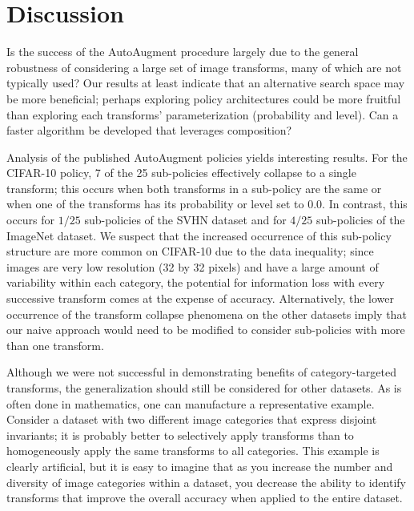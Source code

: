 \documentclass[10pt,twocolumn,letterpaper]{article}
\begin{document}
\section{Discussion}
  Is the success of the AutoAugment procedure largely due to the general robustness of considering a large set of image transforms, many of which are not typically used? Our results at least indicate that an alternative search space may be more beneficial; perhaps exploring policy architectures could be more fruitful than exploring each transforms' parameterization (probability and level). Can a faster algorithm be developed that leverages composition?

  Analysis of the published AutoAugment policies yields interesting results. For the CIFAR-10 policy, 7 of the 25 sub-policies effectively collapse to a single transform; this occurs when both transforms in a sub-policy are the same or when one of the transforms has its probability or level set to $0.0$. In contrast, this occurs for $1/25$ sub-policies of the SVHN dataset and for $4/25$ sub-policies of the ImageNet dataset. We suspect that the increased occurrence of this sub-policy structure are more common on CIFAR-10 due to the data inequality; since images are very low resolution (32 by 32 pixels) and have a large amount of variability within each category, the potential for information loss with every successive transform comes at the expense of accuracy. Alternatively, the lower occurrence of the transform collapse phenomena on the other datasets imply that our naive approach would need to be modified to consider sub-policies with more than one transform. 

  Although we were not successful in demonstrating benefits of category-targeted transforms, the generalization should still be considered for other datasets. As is often done in mathematics, one can manufacture a representative example. Consider a dataset with two different image categories that express disjoint invariants; it is probably better to selectively apply transforms than to homogeneously apply the same transforms to all categories. This example is clearly artificial, but it is easy to imagine that as you increase the number and diversity of image categories within a dataset, you decrease the ability to identify transforms that improve the overall accuracy when applied to the entire dataset.

% 
 
\end{document}
